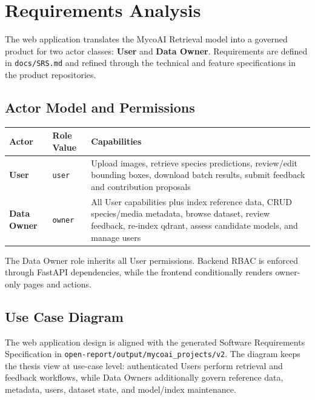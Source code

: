 \section{Requirements Analysis}\label{requirements-analysis}

The web application translates the MycoAI Retrieval model into a governed product for two actor classes: \textbf{User} and \textbf{Data Owner}. Requirements are defined in \texttt{docs/SRS.md} and refined through the technical and feature specifications in the product repositories.

\subsection{Actor Model and Permissions}\label{actor-model-and-permissions}

\begin{center}
\begin{tabular}{@{}p{3cm} p{4.5cm} p{6.5cm}@{}}
\toprule
\textbf{Actor} & \textbf{Role Value} & \textbf{Capabilities} \\
\midrule
\textbf{User} & \texttt{user} & Upload images, retrieve species predictions, review/edit bounding boxes, download batch results, submit feedback and contribution proposals \\
\textbf{Data Owner} & \texttt{owner} & All User capabilities plus index reference data, CRUD species/media metadata, browse dataset, review feedback, re-index \gls{qdrant}, assess candidate models, and manage users \\
\bottomrule
\end{tabular}
\end{center}

The Data Owner role inherits all User permissions. Backend RBAC is enforced through FastAPI dependencies, while the frontend conditionally renders owner-only pages and actions.

\subsection{Use Case Diagram}\label{use-case-diagram}

The web application design is aligned with the generated Software Requirements Specification in \texttt{open-report/output/mycoai\_projects/v2}. The diagram keeps the thesis view at use-case level: authenticated Users perform retrieval and feedback workflows, while Data Owners additionally govern reference data, metadata, users, dataset state, and model/index maintenance.

